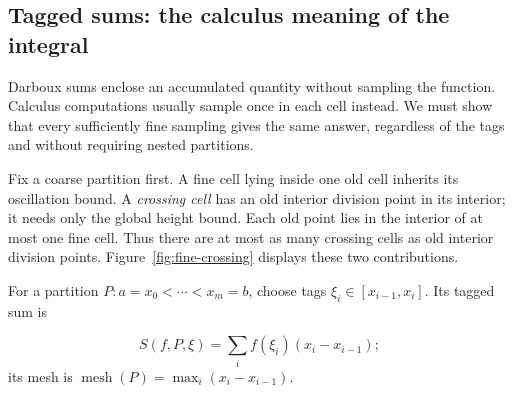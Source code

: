 \subsection{Tagged sums: the calculus meaning of the integral}

Darboux sums enclose an accumulated quantity without sampling the function.
Calculus computations usually sample once in each cell instead. We must
show that every sufficiently fine sampling gives the same answer, regardless
of the tags and without requiring nested partitions.

Fix a coarse partition first. A fine cell lying inside one old cell
inherits its oscillation bound. A \emph{crossing cell} has an old interior
division point in its interior; it needs only the global height bound.
Each old point lies in the interior of at most one fine cell. Thus there
are at most as many crossing cells as old interior division points.
Figure~\ref{fig:fine-crossing} displays these two contributions.


For a partition $P:a=x_0<\cdots<x_m=b$, choose tags
$\xi_i\in[x_{i-1},x_i]$. Its tagged sum is

\[
S(f,P,\xi)=\sum_i f(\xi_i)(x_i-x_{i-1});
\]
 its mesh is
$\operatorname{mesh}(P)=\max_i(x_i-x_{i-1})$.

